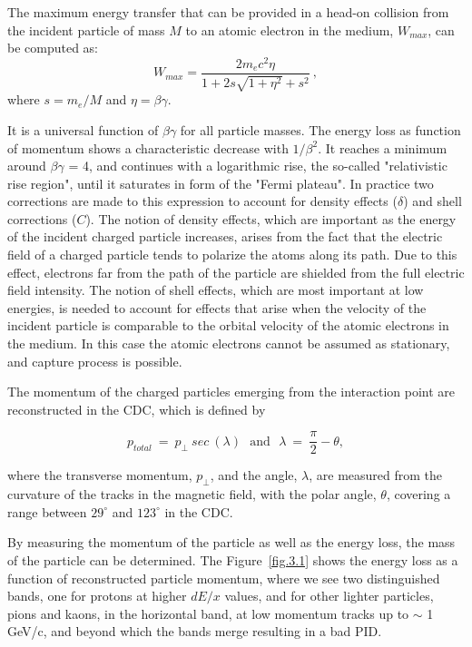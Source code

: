 The maximum energy transfer that can be provided in a head-on collision from the incident particle of mass $M$ to an atomic electron in the medium, $W_{max}$, can be computed as:
\begin{equation}
    \label{eq.3.2}
    W_{max} = \frac{2 m_e c^2 \eta}{1 + 2 s \sqrt{1 + \eta^2} + s^2}~,
\end{equation}
where $s = m_e/M$ and $\eta = \beta \gamma$.
~\par It is a universal function of $\beta \gamma$ for all particle masses. The energy loss as function of momentum shows a characteristic decrease with $1/\beta^{2}$. It reaches a minimum around $\beta \gamma$ = 4, and continues with a logarithmic rise, the so-called "relativistic rise region", until it saturates in form of the "Fermi plateau". In practice two corrections are made to this expression to account for density effects ($\delta$) and shell corrections ($C$). The notion of density effects, which are important as the energy of the incident charged particle increases, arises from the fact that the electric field of a charged particle tends to polarize the atoms along its path. Due to this effect, electrons far from the path of the particle are shielded from the full electric field intensity. The notion of shell effects, which are most important at low energies, is needed to account for effects that arise when the velocity of the incident particle is comparable to the orbital velocity of the atomic electrons in the medium. In this case the atomic electrons cannot be assumed as stationary, and capture process is possible.
~\par The momentum of the charged particles emerging from the interaction point are reconstructed in the CDC, which is defined by

\begin{equation}
    \label{eq.3.2.1}
    p_{total}~=~p_{\perp}~sec~(\lambda)~~~\mathrm{and}~~~\lambda~=~\frac{\pi}{2}-\theta,
\end{equation}

\noindent where the transverse momentum, $p_{\perp}$, and the angle, $\lambda$, are measured from the curvature of the tracks in the magnetic field, with the polar angle, $\theta$, covering a range between $29^{\circ}$ and $123^{\circ}$ in the CDC.
~\par By measuring the momentum of the particle as well as the energy loss, the mass of the particle can be determined. The Figure~\ref{fig.3.1} shows the energy loss as a function of reconstructed particle momentum, where we see two distinguished bands, one for protons at higher $dE/x$ values, and for other lighter particles, pions and kaons, in the horizontal band, at low momentum tracks up to $\sim$ 1 GeV/c, and beyond which the bands merge resulting in a bad PID.

